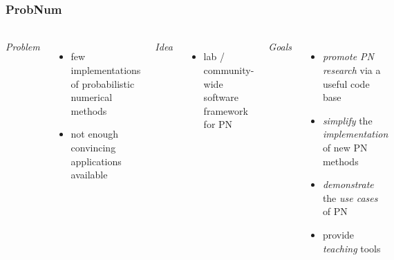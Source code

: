 \documentclass[10pt,usepdftitle=false,aspectratio=169]{beamer}
\begin{document}
\begin{frame}\frametitle{ProbNum}
	\framesubtitle{}

	\begin{columns}[totalwidth=\textwidth]

		\emph{Problem}
		\begin{itemize}
			\item few implementations of probabilistic numerical methods
			\item not enough convincing applications available
		\end{itemize}

		\emph{Idea}
		\begin{itemize}
			\item lab / community-wide software framework for PN
		\end{itemize}

		\emph{Goals}
		\begin{itemize}
			\item \textit{promote PN research} via a useful code base
			\item \textit{simplify} the \textit{implementation} of new PN methods
			\item \textit{demonstrate} the \textit{use cases} of PN
			\item provide \textit{teaching} tools
		\end{itemize}

		\centering
		\vspace{-3ex}
		\href{https://github.com/probabilistic-numerics/probnum/}{\includegraphics[scale=0.3]{figures/probnum_logo_text.png}}
		\includegraphics[width=\textwidth]{figures/probnum_contributors.png}
		\begin{center}
			\begin{tikzpicture}[yscale=.6]


\end{tikzpicture}
\end{center}
\end{columns}
\end{frame}
\end{document}
